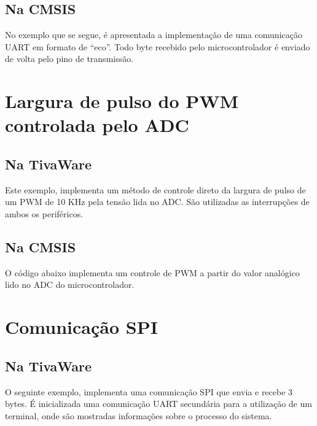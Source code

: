 

\subsection{Na CMSIS}
No exemplo que se segue, é apresentada a implementação de uma comunicação UART em formato de ``eco''. Todo byte recebido pelo microcontrolador é enviado de volta pelo pino de transmissão.



\section{Largura de pulso do PWM controlada pelo ADC}
\label{sec:exPwm}

\subsection{Na TivaWare}
Este exemplo, implementa um método de controle direto da largura de pulso de um PWM de 10 KHz  pela tensão lida no ADC. São utilizadas as interrupções de ambos os periféricos.



\subsection{Na CMSIS}
O código abaixo implementa um controle de PWM a partir do valor analógico lido no ADC do microcontrolador.



\section{Comunicação SPI}
\label{sec:exSSI}

\subsection{Na TivaWare}
O seguinte exemplo, implementa uma comunicação SPI que envia e recebe 3 bytes. É inicializada uma comunicação UART secundária para a utilização de um terminal, onde são mostradas informações sobre o processo do sistema.

